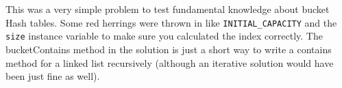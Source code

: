 \documentclass[12pt,letter]{article}
\begin{document}
\noindent This was a very simple problem to test fundamental knowledge about bucket Hash tables. 
Some red herrings were thrown in like \texttt{INITIAL\_CAPACITY} and the \texttt{size} instance variable to make sure 
you calculated the index correctly. The bucketContains method in the solution is just a short way to write a contains
method for a linked list recursively (although an iterative solution would have been just fine as well).
\end{document}
